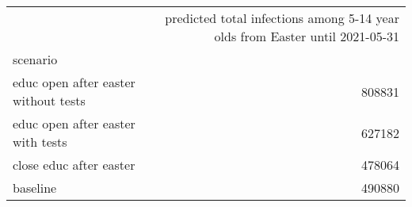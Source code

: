 \begin{tabular}{lr}
\toprule
{} &  predicted total infections among 5-14 year olds from Easter until 2021-05-31 \\
scenario                               &                                                                               \\
\midrule
 educ open after easter  without tests &                                             808831 \\
 educ open after easter  with tests    &                                             627182 \\
 close educ after easter               &                                             478064 \\
 baseline                              &                                             490880 \\
\bottomrule
\end{tabular}

